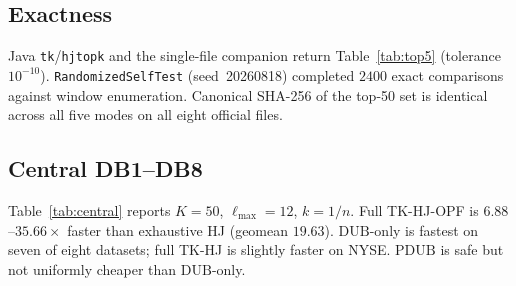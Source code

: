\documentclass[preprint,12pt]{elsarticle}
\newcommand{\DUB}{\mathrm{DUB}}
\newcommand{\PDUB}{\mathrm{PDUB}}
\theoremstyle{plain}
\theoremstyle{definition}
\theoremstyle{remark}
\begin{document}
\subsection{Exactness}
Java \texttt{tk}/\texttt{hjtopk} and the single-file companion return Table~\ref{tab:top5} (tolerance $10^{-10}$). \texttt{RandomizedSelf\-Test} (seed~20260818) completed $2400$ exact comparisons against window enumeration. Canonical SHA-256 of the top-50 set is identical across all five modes on all eight official files.

\subsection{Central DB1--DB8}
Table~\ref{tab:central} reports $K=50$, $\ell_{\max}=12$, $k=1/n$. Full TK-HJ-OPF is $6.88$--$35.66\times$ faster than exhaustive HJ (geomean $19.63$). $\DUB$-only is fastest on seven of eight datasets; full TK-HJ is slightly faster on NYSE. $\PDUB$ is safe but not uniformly cheaper than $\DUB$-only.

\begin{table}[t]
\caption{Central campaign, $K=50$, $\ell_{\max}=12$, $k=1/n$. Median ms, ten measured runs after five warmups.}
\label{tab:central}
\centering
\small
\setlength{\tabcolsep}{4pt}
\end{table}
\end{document}
